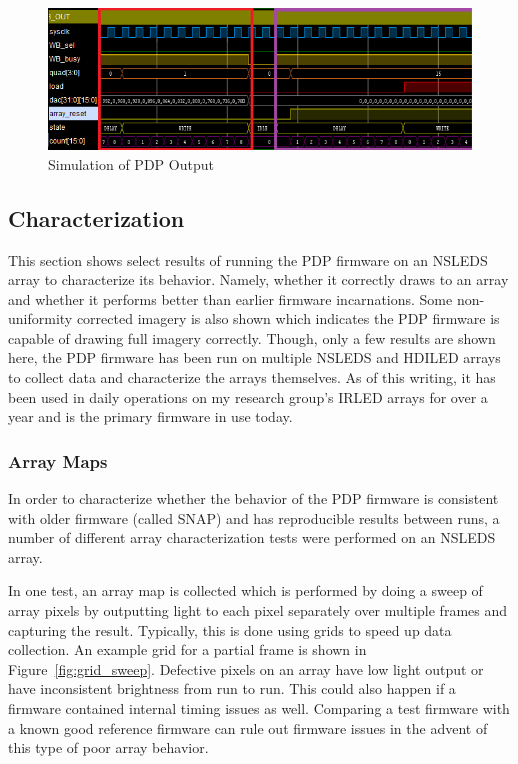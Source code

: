    \begin{figure}
        \centering
        \includegraphics[width=1.0\textwidth]{fig/pdp_output_example.png}
        \caption{Simulation of PDP Output}
        \label{fig:output_example}
    \end{figure}

    \subsection{Characterization}
        This section shows select results of running the PDP firmware on an NSLEDS array to characterize its behavior. Namely, whether it correctly draws to an array and whether it performs better than earlier firmware incarnations. Some non-uniformity corrected imagery is also shown which indicates the PDP firmware is capable of drawing full imagery correctly. Though, only a few results are shown here, the PDP firmware has been run on multiple NSLEDS and HDILED arrays to collect data and characterize the arrays themselves. As of this writing, it has been used in daily operations on my research group's IRLED arrays for over a year and is the primary firmware in use today.

        \subsubsection {Array Maps}
            In order to characterize whether the behavior of the PDP firmware is consistent with older firmware (called SNAP) and has reproducible results between runs, a number of different array characterization tests were performed on an NSLEDS array.

            In one test, an array map is collected which is performed by doing a sweep of array pixels by outputting light to each pixel separately over multiple frames and capturing the result. Typically, this is done using grids to speed up data collection. An example grid for a partial frame is shown in Figure~\ref{fig:grid_sweep}. Defective pixels on an array have low light output or have inconsistent brightness from run to run. This could also happen if a firmware contained internal timing issues as well. Comparing a test firmware with a known good reference firmware can rule out firmware issues in the advent of this type of poor array behavior.

